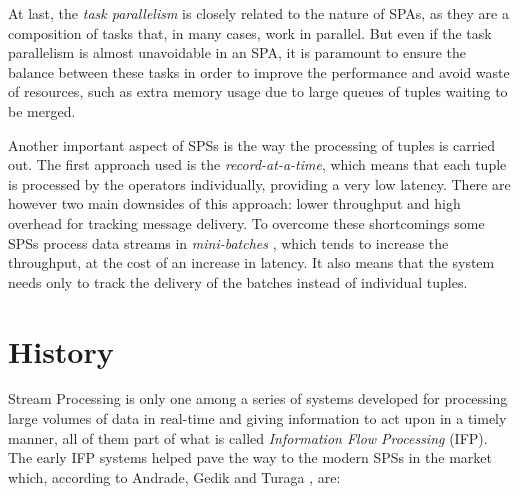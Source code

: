 \documentclass[ppgc,diss,english]{iiufrgs}
\begin{document}
At last, the \emph{task parallelism} is closely related to the nature of SPAs, as they are a composition of tasks that, in many cases, work in parallel. But even if the task parallelism is almost unavoidable in an SPA, it is paramount to ensure the balance between these tasks in order to improve the performance and avoid waste of resources, such as extra memory usage due to large queues of tuples waiting to be merged.


Another important aspect of SPSs is the way the processing of tuples is carried out. The first approach used is the \emph{record-at-a-time}, which means that each tuple is processed by the operators individually, providing a very low latency. There are however two main downsides of this approach: lower throughput and high overhead for tracking message delivery. To overcome these shortcomings some SPSs process data streams in \emph{mini-batches} \cite{muralidharan2014fault}, which tends to increase the throughput, at the cost of an increase in latency. It also means that the system needs only to track the delivery of the batches instead of individual tuples.


\section{History}
\label{sec:esp:history}

Stream Processing is only one among a series of systems developed for processing large volumes of data in real-time and giving information to act upon in a timely manner, all of them part of what is called \emph{Information Flow Processing} (IFP). The early IFP systems helped pave the way to the modern SPSs in the market which, according to Andrade, Gedik and Turaga \cite{andrade2014fundamentals}, are: 

\end{document}
